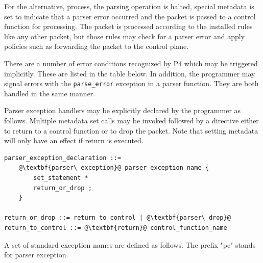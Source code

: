 \documentclass[12pt]{article}
\begin{document}
For the alternative, process, the parsing operation is halted, special metadata
is set to indicate that a parser error occurred and the packet is passed to
a control function for \matchaction processing. The packet is processed according
to the installed \matchaction rules like any other packet, but those rules
may check for a parser error and apply policies such as forwarding the packet
to the control plane.

There are a number of error conditions recognized by P4 which may be triggered
implicitly. These are listed in the table below. In addition, the programmer
may signal errors with the \texttt{parse_error} exception in a parser function. They
are both handled in the same manner.

Parser exception handlers may be explicitly declared by the programmer as
follows. Multiple metadata set calls may be invoked followed by a directive
either to return to a control function or to drop the packet. Note that setting
metadata will only have an effect if return is executed.

\begin{lstlisting}[frame=single,backgroundcolor=\color{bnfgreen},escapechar=\@]
parser_exception_declaration ::=
    @\textbf{parser\_exception}@ parser_exception_name {
        set_statement *
        return_or_drop ;
    }

return_or_drop ::= return_to_control | @\textbf{parser\_drop}@
return_to_control ::= @\textbf{return}@ control_function_name
\end{lstlisting}



A set of standard exception names are defined as follows.  The prefix "pe"
stands for parser exception.
\end{document}
